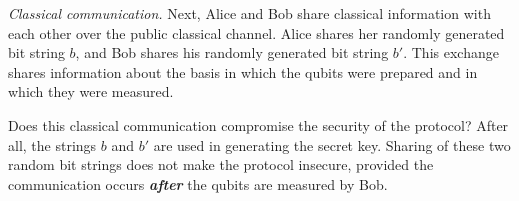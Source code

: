 



\emph{Classical communication.}
Next, Alice and Bob share classical information with each other over the public classical channel.
Alice shares her randomly generated bit string $b$, and Bob shares his randomly generated bit string $b'$.
This exchange shares information about the basis in which the qubits were prepared and in which they were measured.

Does this classical communication compromise the security of the protocol?
After all, the strings $b$ and $b'$ are used in generating the secret key.
Sharing of these two random bit strings does not make the protocol insecure, provided the communication occurs \textbf{\emph{after}} the qubits are measured by Bob.

